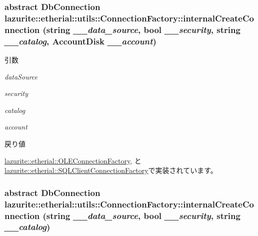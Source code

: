 \hypertarget{classlazurite_1_1etherial_1_1utils_1_1_connection_factory_a21c31b431a87b330f8a7030140059861}{
\subsubsection[{internalCreateConnection}]{\setlength{\rightskip}{0pt plus 5cm}abstract DbConnection lazurite::etherial::utils::ConnectionFactory::internalCreateConnection (string {\em \_\-\_\-data\_\-source}, \/  bool {\em \_\-\_\-security}, \/  string {\em \_\-\_\-catalog}, \/  {\bf AccountDisk} {\em \_\-\_\-account})}}
\label{classlazurite_1_1etherial_1_1utils_1_1_connection_factory_a21c31b431a87b330f8a7030140059861}

\begin{DoxyParams}{引数}
\item[{\em dataSource}]\item[{\em security}]\item[{\em catalog}]\item[{\em account}]\end{DoxyParams}
\begin{DoxyReturn}{戻り値}

\end{DoxyReturn}


\hyperlink{classlazurite_1_1etherial_1_1_o_l_e_connection_factory_aa149a9d42af61c87fd73c516bbe43384}{lazurite::etherial::OLEConnectionFactory}, と \hyperlink{classlazurite_1_1etherial_1_1_s_q_l_client_connection_factory_a36d7093be17f200a15c05bf63fd1eeb1}{lazurite::etherial::SQLClientConnectionFactory}で実装されています。\hypertarget{classlazurite_1_1etherial_1_1utils_1_1_connection_factory_adc19f91b5686f5a21af75a180bab6db3}{
\subsubsection[{internalCreateConnection}]{\setlength{\rightskip}{0pt plus 5cm}abstract DbConnection lazurite::etherial::utils::ConnectionFactory::internalCreateConnection (string {\em \_\-\_\-data\_\-source}, \/  bool {\em \_\-\_\-security}, \/  string {\em \_\-\_\-catalog})}}
\label{classlazurite_1_1etherial_1_1utils_1_1_connection_factory_adc19f91b5686f5a21af75a180bab6db3}

